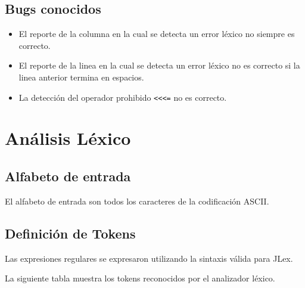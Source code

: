 \documentclass [a4paper,titlepage]{report}
\begin{document}
\subsection{Bugs conocidos}
\begin{itemize}

\item El reporte de la columna en la cual se detecta un error léxico
no siempre es correcto.

\item El reporte de la linea en la cual se detecta un error léxico no 
es correcto si la linea anterior termina en espacios.

\item La detección del operador prohibido
\texttt{\textless{}\textless{}\textless{}=} no es correcto.

\end{itemize}

\section{Análisis Léxico}

\subsection{Alfabeto de entrada}

El alfabeto de entrada son todos los caracteres de la codificación ASCII.

\subsection{Definición de Tokens}

Las expresiones regulares se expresaron utilizando la sintaxis válida para JLex.

La siguiente tabla muestra los tokens reconocidos por el analizador léxico.
\end{document}
